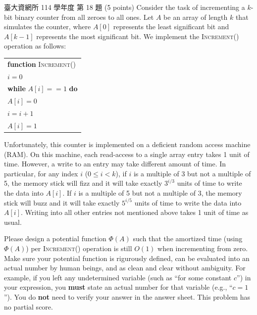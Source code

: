 \begin{pastexam}[label={px:amo-3}]{臺大資網所 114 學年度 第 18 題}
(5 points) Consider the task of incrementing a $k$-bit binary counter from all zeroes to
all ones. Let $A$ be an array of length $k$ that simulates the counter, where $A[0]$
represents the least significant bit and $A[k-1]$ represents the most significant bit.
We implement the \textsc{Increment}() operation as follows:
\begin{center}
\begin{tabular}{l}
\hline
\textbf{function} \textsc{Increment}() \\
\quad $i=0$ \\
\quad \textbf{while} $A[i]==1$ \textbf{do} \\
\quad\quad $A[i]=0$ \\
\quad\quad $i=i+1$ \\
\quad $A[i]=1$ \\
\hline
\end{tabular}
\end{center}
Unfortunately, this counter is implemented on a deficient random access machine (RAM). On
this machine, each read-access to a single array entry takes 1 unit of time. However, a
write to an entry may take different amount of time. In particular, for any index $i$
($0\le i<k$), if $i$ is a multiple of 3 but not a multiple of 5, the memory stick will
fizz and it will take exactly $3^{i/3}$ units of time to write the data into $A[i]$. If
$i$ is a multiple of 5 but not a multiple of 3, the memory stick will buzz and it will
take exactly $5^{i/5}$ units of time to write the data into $A[i]$. Writing into all
other entries not mentioned above takes 1 unit of time as usual.

Please design a potential function $\Phi(A)$ such that the amortized time (using
$\Phi(A)$) per \textsc{Increment}() operation is still $O(1)$ when incrementing from
zero. Make sure your potential function is rigurously defined, can be evaluated into an
actual number by human beings, and as clean and clear without ambiguity. For example, if
you left any undetermined variable (such as ``for some constant $c$'') in your
expression, you \textbf{must} state an actual number for that variable (e.g.,
``$c=1$''). You do \textbf{not} need to verify your answer in the answer sheet. This
problem has no partial score.
\end{pastexam}

